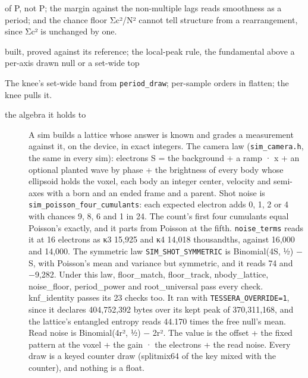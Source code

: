 \begin{description}
of P, not P; the margin against the non-multiple lags reads smoothness as a period; and the chance floor Σc²/N² cannot tell structure from a rearrangement, since Σc² is unchanged by one.
\item[{status}] built, proved against its reference; the local-peak rule, the fundamental above a per-axis drawn null or a set-wide top
\item[{next}] The knee's set-wide band from \texttt{period\_\allowbreak{}draw}; per-sample orders in flatten; the knee pulls it.
\end{description}

\begin{description}
\item[{the algebra it holds to}] A sim builds a lattice whose answer is known and grades a measurement against it, on the device, in exact integers. The camera law (\texttt{sim\_\allowbreak{}camera.\allowbreak{}h}, the same in every sim): electrons S = the background + a ramp · x + an optional planted wave by phase + the brightness of every body whose ellipsoid holds the voxel, each body an integer center, velocity and semi-axes with a born and an ended frame and a parent. Shot noise is \texttt{sim\_\allowbreak{}poisson\_\allowbreak{}four\_\allowbreak{}cumulants}: each expected electron adds 0, 1, 2 or 4 with chances 9, 8, 6 and 1 in 24. The count's first four cumulants equal Poisson's exactly, and it parts from Poisson at the fifth. \texttt{noise\_\allowbreak{}terms} reads it at 16 electrons as κ3 15,925 and κ4 14,018 thousandths, against 16,000 and 14,000. The symmetric law \texttt{SIM\_\allowbreak{}SHOT\_\allowbreak{}SYMMETRIC} is Binomial(4S, ½) − S, with Poisson's mean and variance but symmetric, and it reads 74 and −9,282. Under this law, floor\_\allowbreak{}match, floor\_\allowbreak{}track, nbody\_\allowbreak{}lattice, noise\_\allowbreak{}floor, period\_\allowbreak{}power and root\_\allowbreak{}universal pass every check. knf\_\allowbreak{}identity passes its 23 checks too. It ran with \texttt{TESSERA\_\allowbreak{}OVERRIDE=1}, since it declares 404,752,392 bytes over its kept peak of 370,311,168, and the lattice's entangled entropy reads 44.170 times the free null's mean. Read noise is Binomial(4r², ½) − 2r². The value is the offset + the fixed pattern at the voxel + the gain · the electrons + the read noise. Every draw is a keyed counter draw (splitmix64 of the key mixed with the counter), and nothing is a float.

\end{description}
